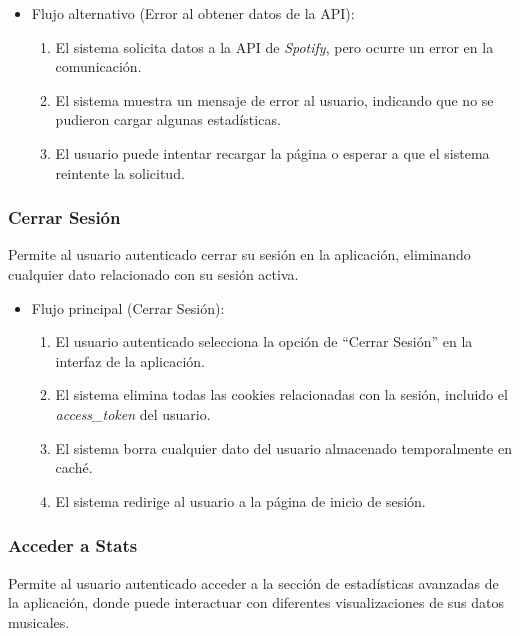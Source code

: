 \begin{itemize}
\begin{enumerate}
          \end{enumerate}
    \item Flujo alternativo (Error al obtener datos de la API):
          \begin{enumerate}
              \item El sistema solicita datos a la API de \textit{Spotify}, pero ocurre un error en la comunicación.
              \item El sistema muestra un mensaje de error al usuario, indicando que no se pudieron cargar algunas estadísticas.
              \item El usuario puede intentar recargar la página o esperar a que el sistema reintente la solicitud.
          \end{enumerate}
\end{itemize}

\subsubsection*{Cerrar Sesión}

Permite al usuario autenticado cerrar su sesión en la aplicación, eliminando cualquier dato relacionado con su sesión activa.

\begin{itemize}
    \item Flujo principal (Cerrar Sesión):
          \begin{enumerate}
              \item El usuario autenticado selecciona la opción de ``Cerrar Sesión'' en la interfaz de la aplicación.
              \item El sistema elimina todas las cookies relacionadas con la sesión, incluido el \textit{access\_token} del usuario.
              \item El sistema borra cualquier dato del usuario almacenado temporalmente en caché.
              \item El sistema redirige al usuario a la página de inicio de sesión.
          \end{enumerate}
\end{itemize}

\subsubsection*{Acceder a Stats}

Permite al usuario autenticado acceder a la sección de estadísticas avanzadas de la aplicación, donde puede interactuar con diferentes visualizaciones de sus datos musicales.

